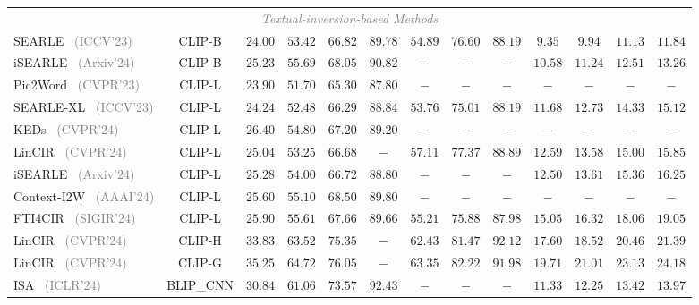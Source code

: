 \begin{table*}
\begin{tabular}{l|c|cccc|ccc|cccc}
    \multicolumn{13}{c}{\textit{\textcolor{gray}{Textual-inversion-based Methods}}}\\
    SEARLE~\cite{searle} \footnotesize{\textcolor{gray}{(ICCV'23)}} & CLIP-B & $24.00 $ & $53.42$ & $66.82$ & $89.78$ & $54.89$ & $76.60$ & $88.19$ & $9.35$ & $9.94$ & $11.13$ &$11.84$\\
    iSEARLE~\cite{isearle} \footnotesize{\textcolor{gray}{(Arxiv'24)}} & CLIP-B & $25.23$ & $55.69$ & $68.05$ & $90.82$ & $-$ & $-$ & $-$ & $10.58$ & $11.24$ & $12.51$ & $13.26$\\
    Pic2Word~\cite{pic2word} \footnotesize{\textcolor{gray}{(CVPR'23)}} & CLIP-L & $23.90 $ & $51.70$ & $65.30$ & $87.80$ & $-$ & $-$ & $-$ & $-$ & $-$ & $-$ &$-$\\
    SEARLE-XL~\cite{searle} \footnotesize{\textcolor{gray}{(ICCV'23)}} & CLIP-L & $24.24 $ & $52.48$ & $66.29$ & $88.84$ & $53.76$ & $75.01$ & $88.19$ & $11.68$ & $12.73$ & $14.33$ &$15.12$\\
    KEDs~\cite{keds} \footnotesize{\textcolor{gray}{(CVPR'24)}} & CLIP-L & $26.40$ & $54.80$ & $67.20$ & $89.20$ & $-$ & $-$ & $-$ & $-$ & $-$ & $-$ & $-$\\
    LinCIR~\cite{lincir} \footnotesize{\textcolor{gray}{(CVPR'24)}} & CLIP-L & $25.04$ & $53.25$ & $66.68$ & $-$ & $57.11$ & $77.37$ & $88.89$ & $12.59$ & $13.58$ & $15.00$ & $15.85$\\
    iSEARLE~\cite{isearle} \footnotesize{\textcolor{gray}{(Arxiv'24)}} & CLIP-L & $25.28$ & $54.00$ & $66.72$ & $88.80$ & $-$ & $-$ & $-$ & $12.50$ & $13.61$ & $15.36$ & $16.25$\\
    Context-I2W~\cite{context_i2w} \footnotesize{\textcolor{gray}{(AAAI'24)}} & CLIP-L & $25.60$ & $55.10$ & $68.50$ & $89.80$ & $-$ & $-$ & $-$ & $-$ & $-$ & $-$ & $-$\\
    FTI4CIR~\cite{fti4cir} \footnotesize{\textcolor{gray}{(SIGIR'24)}} & CLIP-L & $25.90$ & $55.61$ & $67.66$ & $89.66$ & $55.21$ & $75.88$ & $87.98$ & $15.05$ & $16.32$ & $18.06$ & $19.05$\\
    LinCIR~\cite{lincir} \footnotesize{\textcolor{gray}{(CVPR'24)}} & CLIP-H & $33.83$ & $63.52$ & $75.35$ & $-$ & $62.43$ & $81.47$ & $92.12$ & $17.60$ & $18.52$ & $20.46$ & $21.39$\\
    LinCIR~\cite{lincir} \footnotesize{\textcolor{gray}{(CVPR'24)}} & CLIP-G & $35.25$ & $64.72$ & $76.05$ & $-$ & $63.35$ & $82.22$ & $91.98$ & $19.71$ & $21.01$ & $23.13$ & $24.18$\\  
    ISA~\cite{isa} \footnotesize{\textcolor{gray}{(ICLR'24)}} & BLIP\_CNN & $30.84$ & $61.06$ & $73.57$ & $92.43$ & $-$ & $-$ & $-$ & $11.33$ & $12.25$ & $13.42$ & $13.97$\\

\end{tabular}
\end{table*}
